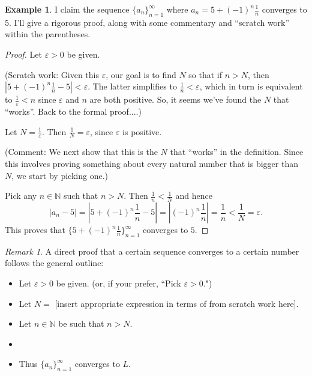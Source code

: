 \documentclass[12pt]{amsart}
\def\e{\varepsilon}
\newcommand{\N}{\mathbb{N}}
\numberwithin{equation}{section}
\theoremstyle{plain} %
\theoremstyle{definition}
\newtheorem{ex}[equation]{Example}
\theoremstyle{remark}
\newtheorem{rem}[equation]{Remark}
\begin{document}
\begin{ex} I claim the sequence $\{a_n\}_{n=1}^\infty$ where $a_n =  5 + (-1)^n \frac{1}{n}$ converges to $5$. I'll give a rigorous proof, along with some commentary and
  ``scratch work'' within the parentheses. 

\begin{proof} Let $\e > 0$ be given. 

(Scratch work: Given this $\e$, our goal is to find $N$ so that if $n > N$, then 
$|5 + (-1)^n \frac{1}{n} - 5| < \e$. The latter simplifies to
$\frac{1}{n} < \e$, which in turn is equivalent to $\frac{1}{\e} < n$ since
$\e$ and $n$ are both positive.  So, it seems we've found the $N$ that
``works''. Back to the formal proof....)


Let $N = \frac{1}{\e}$. Then $\frac{1}{N}
= \e$, since $\e$ is positive.  

(Comment: We next show that this is the $N$ that ``works'' in
the definition. Since this involves proving something about every natural number that is bigger than $N$, 
we start by picking one.) 

Pick any $n \in \N$ such that  $n >
N$. Then $\frac{1}{n} < \frac{1}{N}$ and hence
$$
|a_n - 5| = |5 + (-1)^n \frac{1}{n} - 5| = 
|(-1)^n \frac{1}{n}| = \frac{1}{n} < \frac{1}{N} = \e.
$$
This proves that 
$\{5 + (-1)^n \frac{1}{n}\}_{n=1}^\infty$ converges to $5$.
\end{proof}
\end{ex}


\begin{rem} A direct proof that a certain sequence converges to a certain number follows the general outline:
\begin{itemize}
	\item Let $\e > 0$ be given. (or, if your prefer, ``Pick $\e > 0$.")
	\item Let $N =$ [insert appropriate expression in terms of  from scratch work here].
	\item Let $n \in \N$ be such that $n > N$.
\item \null [Argument that $|a_n-L|<\e$]
	\item Thus $\{a_n\}_{n=1}^{\infty}$ converges to $L$.
\end{itemize}
\end{rem}
\end{document}

